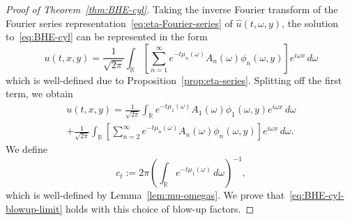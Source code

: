 \documentclass[a4paper, reqno]{amsart}
\numberwithin{equation}{section}
\theoremstyle{plain}
\theoremstyle{definition}
\theoremstyle{remark}
\newcommand{\RR}{\mathbb{R}}
\begin{document}
\begin{proof}[Proof of Theorem~\ref{thm:BHE-cyl}]
  Taking the inverse Fourier transform of the Fourier series representation~\eqref{eq:eta-Fourier-series} of $\widehat{u}(t,\omega,y)$, the solution to~\eqref{eq:BHE-cyl} can be represented in the form
  \begin{equation*}
    u(t,x,y)
    = \frac{1}{\sqrt{2\pi}}\int_{\RR} \left[ \sum_{n=1}^\infty e^{-t \mu_n(\omega)} A_n(\omega) \phi_n(\omega, y) \right] e^{i \omega x} \,d\omega
  \end{equation*}
  which is well-defined due to Proposition~\ref{prop:eta-series}. Splitting off the first term, we obtain
  \begin{multline}
    \label{eq:u-split1}
    u(t,x,y)
    = \frac{1}{\sqrt{2\pi}}\int_{\RR} e^{-t \mu_1(\omega)} A_1(\omega) \phi_1(\omega, y) e^{i\omega x} \,d\omega \\
    + \frac{1}{\sqrt{2\pi}}\int_{\RR} \left[ \sum_{n=2}^\infty e^{-t \mu_n(\omega)} A_n(\omega) \phi_n(\omega, y) \right] e^{i \omega x} \,d\omega.
  \end{multline}
  We define
  \begin{equation}
    \label{eq:ct-cyl}
    c_t:=2\pi\left(\int_{\RR}e^{-t\mu_1(\omega)}\,d\omega\right)^{-1},
  \end{equation}
  which is well-defined by Lemma~\ref{lem:mu-omegas}. We prove that~\eqref{eq:BHE-cyl-blowup-limit} holds with this choice of blow-up factors.


\end{proof}
\end{document}
